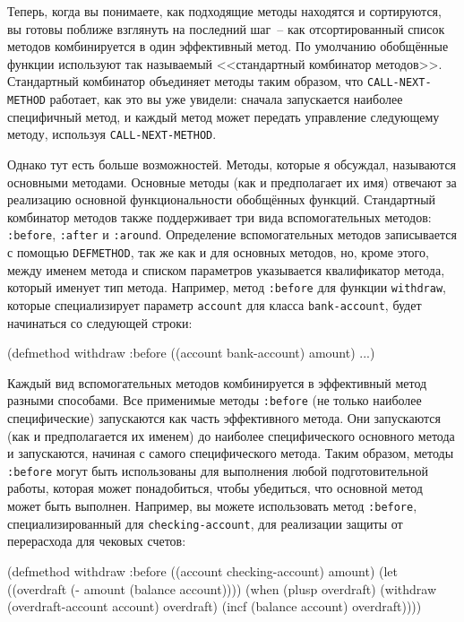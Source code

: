 Теперь, когда вы понимаете, как подходящие методы находятся и сортируются, вы готовы
поближе взглянуть на последний шаг~-- как отсортированный список методов комбинируется в
один эффективный метод.  По умолчанию обобщённые функции используют так называемый
<<стандартный комбинатор методов>>.  Стандартный комбинатор объединяет методы таким образом,
что \lstinline{CALL-NEXT-METHOD} работает, как это вы уже увидели: сначала запускается
наиболее специфичный метод, и каждый метод может передать управление следующему методу,
используя \lstinline{CALL-NEXT-METHOD}.

Однако тут есть больше возможностей.  Методы, которые я обсуждал, называются основными
методами.  Основные методы (как и предполагает их имя) отвечают за реализацию основной
функциональности обобщённых функций.  Стандартный комбинатор методов также поддерживает
три вида вспомогательных методов: \lstinline{:before}, \lstinline{:after} и \lstinline{:around}.
Определение вспомогательных методов записывается с помощью \lstinline{DEFMETHOD}, так же как и
для основных методов, но, кроме этого, между именем метода и списком параметров указывается
квалификатор метода, который именует тип метода.  Например, метод \lstinline{:before} для
функции \lstinline{withdraw}, которые специализирует параметр \lstinline{account} для класса
\lstinline{bank-account}, будет начинаться со следующей строки:

\begin{myverb}
(defmethod withdraw :before ((account bank-account) amount) ...)
\end{myverb}

Каждый вид вспомогательных методов комбинируется в эффективный метод разными способами.
Все применимые методы \lstinline{:before} (не только наиболее специфические) запускаются как
часть эффективного метода.  Они запускаются (как и предполагается их именем) до наиболее
специфического основного метода и запускаются, начиная с самого специфического метода.
Таким образом, методы \lstinline{:before} могут быть использованы для выполнения любой
подготовительной работы, которая может понадобиться, чтобы убедиться, что основной метод
может быть выполнен.  Например, вы можете использовать метод \lstinline{:before},
специализированный для \lstinline{checking-account}, для реализации защиты от перерасхода для
чековых счетов:

\begin{myverb}
(defmethod withdraw :before ((account checking-account) amount)
  (let ((overdraft (- amount (balance account))))
    (when (plusp overdraft)
      (withdraw (overdraft-account account) overdraft)
      (incf (balance account) overdraft))))
\end{myverb}

